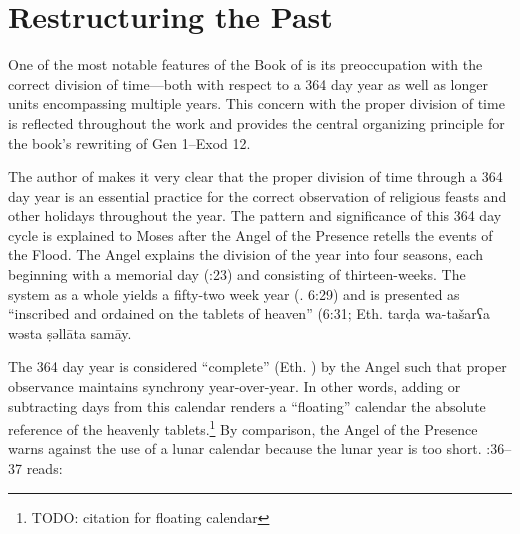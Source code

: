 
\section{Restructuring the Past}

One of the most notable features of the Book of \jub is its preoccupation with the correct division of time---both with respect to a 364 day year as well as longer units encompassing multiple years. This concern with the proper division of time is reflected throughout the work and provides the central organizing principle for the book's rewriting of Gen 1--Exod 12.

The author of \jub makes it very clear that the proper division of time through a 364 day year is an essential practice for the correct observation of religious feasts and other holidays throughout the year. The pattern and significance of this 364 day cycle is explained to Moses after the Angel of the Presence retells the events of the Flood. The Angel explains the division of the year into four seasons, each beginning with a memorial day (:23) and consisting of thirteen-weeks. The system as a whole yields a fifty-two week year (\jub. 6:29) and is presented as ``inscribed and ordained on the tablets of heaven'' (6:31; Eth.
        {tarḍa wa-tašarʕa wəsta ṣəllāta samāy}.

The 364 day year is considered ``complete'' (Eth. ) by the Angel such that proper observance maintains synchrony year-over-year. In other words, adding or subtracting days from this calendar renders a ``floating'' calendar \visavis the absolute reference of the heavenly tablets.\footnote{TODO: citation for floating calendar} By comparison, the Angel of the Presence warns against the use of a lunar calendar because the lunar year is too short. :36--37 reads:

